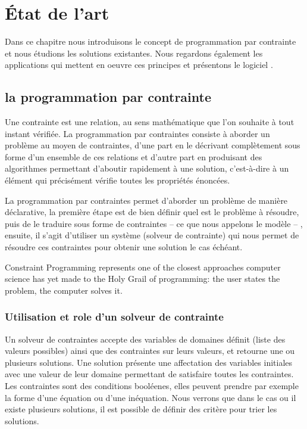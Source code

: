 \chapter{État de l'art}
Dans ce chapitre nous introduisons le concept de programmation par contrainte et nous étudions les solutions existantes. Nous regardons également les applications qui mettent en oeuvre ces principes et présentons le logiciel \iscore{}.
\section{la programmation par contrainte}
\begin{citeauteur}
Une contrainte est une relation, au sens mathématique que l’on souhaite à tout instant vérifiée. La programmation par contraintes consiste à aborder un problème au moyen de contraintes, d’une part en le décrivant complètement sous forme d’un ensemble de ces relations et d’autre part en produisant des algorithmes permettant d’aboutir rapidement à une solution, c'est-à-dire à un élément qui précisément vérifie toutes les propriétés énoncées.
\end{citeauteur}

La programmation par contraintes permet d'aborder un problème de manière déclarative, la première étape est de bien définir quel est le problème à résoudre, puis de le traduire sous forme de contraintes -- ce que nous appelons le modèle -- , ensuite, il s'agit d'utiliser un système (solveur de contrainte) qui nous permet de résoudre ces contraintes pour obtenir une solution le cas échéant.

\begin{citeauteur}
Constraint Programming represents one of the closest approaches computer science has yet made to the Holy Grail of programming: the user states the problem, the computer solves it.
\end{citeauteur}

\subsection{Utilisation et role d'un solveur de contrainte}
\label{section:fonctionnementSolveur}
Un solveur de contraintes accepte des variables de domaines définit (liste des valeurs possibles) ainsi que des contraintes sur leurs valeurs, et retourne une ou plusieurs solutions.
Une solution présente une affectation des variables initiales avec une valeur de leur domaine permettant de satisfaire toutes les contraintes.
Les contraintes sont des conditions booléenes, elles peuvent prendre par exemple la forme d'une équation ou d'une inéquation.
Nous verrons que dans le cas ou il existe plusieurs solutions, il est possible de définir des critère pour trier les solutions.

